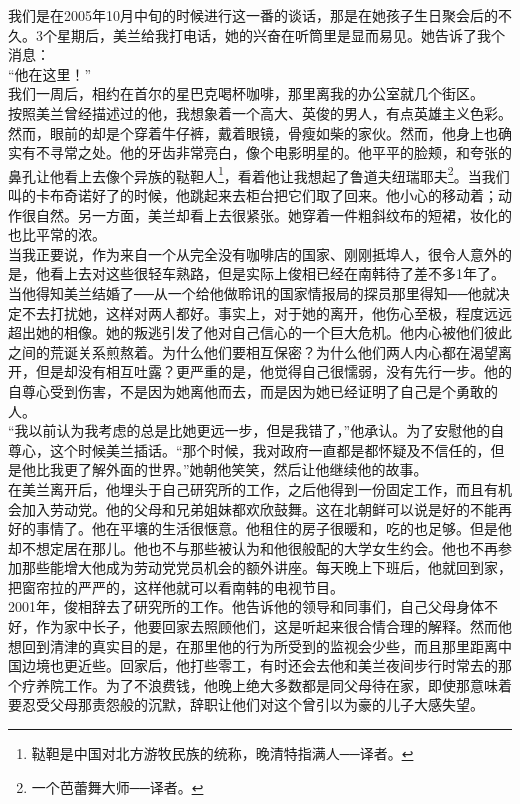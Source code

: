 我们是在2005年10月中旬的时候进行这一番的谈话，那是在她孩子生日聚会后的不久。3个星期后，美兰给我打电话，她的兴奋在听筒里是显而易见。她告诉了我个消息：\\

“他在这里！”\\

我们一周后，相约在首尔的星巴克喝杯咖啡，那里离我的办公室就几个街区。\\

按照美兰曾经描述过的他，我想象着一个高大、英俊的男人，有点英雄主义色彩。然而，眼前的却是个穿着牛仔裤，戴着眼镜，骨瘦如柴的家伙。然而，他身上也确实有不寻常之处。他的牙齿非常亮白，像个电影明星的。他平平的脸颊，和夸张的鼻孔让他看上去像个异族的鞑靼人\footnote{鞑靼是中国对北方游牧民族的统称，晚清特指满人──译者。}，看着他让我想起了鲁道夫纽瑞耶夫\footnote{一个芭蕾舞大师──译者。}。当我们叫的卡布奇诺好了的时候，他跳起来去柜台把它们取了回来。他小心的移动着；动作很自然。另一方面，美兰却看上去很紧张。她穿着一件粗斜纹布的短裙，妆化的也比平常的浓。\\

当我正要说，作为来自一个从完全没有咖啡店的国家、刚刚抵埠人，很令人意外的是，他看上去对这些很轻车熟路，但是实际上俊相已经在南韩待了差不多1年了。当他得知美兰结婚了──从一个给他做聆讯的国家情报局的探员那里得知──他就决定不去打扰她，这样对两人都好。事实上，对于她的离开，他伤心至极，程度远远超出她的相像。她的叛逃引发了他对自己信心的一个巨大危机。他内心被他们彼此之间的荒诞关系煎熬着。为什么他们要相互保密？为什么他们两人内心都在渴望离开，但是却没有相互吐露？更严重的是，他觉得自己很懦弱，没有先行一步。他的自尊心受到伤害，不是因为她离他而去，而是因为她已经证明了自己是个勇敢的人。\\

“我以前认为我考虑的总是比她更远一步，但是我错了，”他承认。为了安慰他的自尊心，这个时候美兰插话。“那个时候，我对政府一直都是都怀疑及不信任的，但是他比我更了解外面的世界。”她朝他笑笑，然后让他继续他的故事。\\

在美兰离开后，他埋头于自己研究所的工作，之后他得到一份固定工作，而且有机会加入劳动党。他的父母和兄弟姐妹都欢欣鼓舞。这在北朝鲜可以说是好的不能再好的事情了。他在平壤的生活很惬意。他租住的房子很暖和，吃的也足够。但是他却不想定居在那儿。他也不与那些被认为和他很般配的大学女生约会。他也不再参加那些能增大他成为劳动党党员机会的额外讲座。每天晚上下班后，他就回到家，把窗帘拉的严严的，这样他就可以看南韩的电视节目。\\

2001年，俊相辞去了研究所的工作。他告诉他的领导和同事们，自己父母身体不好，作为家中长子，他要回家去照顾他们，这是听起来很合情合理的解释。然而他想回到清津的真实目的是，在那里他的行为所受到的监视会少些，而且那里距离中国边境也更近些。回家后，他打些零工，有时还会去他和美兰夜间步行时常去的那个疗养院工作。为了不浪费钱，他晚上绝大多数都是同父母待在家，即使那意味着要忍受父母那责怨般的沉默，辞职让他们对这个曾引以为豪的儿子大感失望。\\


